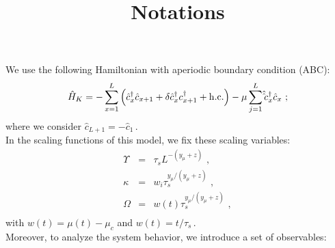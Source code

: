 \documentclass[pra,twocolumn,preprintnumbers,amsmath,amssymb,nofootinbib,floatfix]{revtex4}
\begin{document}
\title{Notations}
\maketitle


We use the following Hamiltonian with aperiodic boundary condition (ABC):
\begin{equation}
\label{HKiataev}
\hat H_K = - \sum_{x=1}^{L} \left( \hat c^\dagger_x \hat c_{x+1}
 + \delta \hat c^\dagger_x c_{x+1}^\dagger + {\rm h.c.}\right)
 - \mu \sum _{j=1}^L \hat \hat c^\dagger_x \hat c_x \,\,;
\end{equation}
where we consider $\hat c_{L+1} = - \hat c_1\,$.\\
In the scaling functions of this model, we fix these scaling variables:
\begin{eqnarray}
\label{Upsilon}
\Upsilon & = & \tau_s L^{-(y_\mu + z)}\,\,, \\
\label{kappa}
\kappa & = & w_i \tau_s^{y_\mu / (y_\mu + z)} \,\,, \\
\label{Omega}
\Omega & = & w(t) \tau_s^{y_\mu / (y_\mu + z)} \,\,, \\
\end{eqnarray}
with $w(t) = \mu(t) - \mu_c$ and $w(t) = t / \tau_s\,$.\\
Moreover, to analyze the system behavior, we introduce a set of 
observables:
\end{document}
